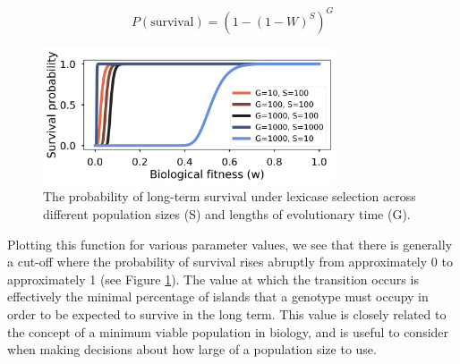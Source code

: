 \begin{equation}
P(\text{survival}) = (1 - (1-W)^{S})^{G}
\end{equation}
\begin{figure}
\includegraphics[width=3.4in]{figs/survival.png}
\caption{The probability of long-term survival under lexicase selection across different population sizes (S) and lengths of evolutionary time (G).}
\label{prob_survival}
\end{figure}
Plotting this function for various parameter values, we see that there is generally a cut-off where the probability of survival rises abruptly from approximately 0 to approximately 1 (see Figure \ref{prob_survival}). The value at which the transition occurs is effectively the minimal percentage of islands that a genotype must occupy in order to be expected to survive in the long term. This value is closely related to the concept of a minimum viable population in biology, and is useful to consider when making decisions about how large of a population size to use. 





